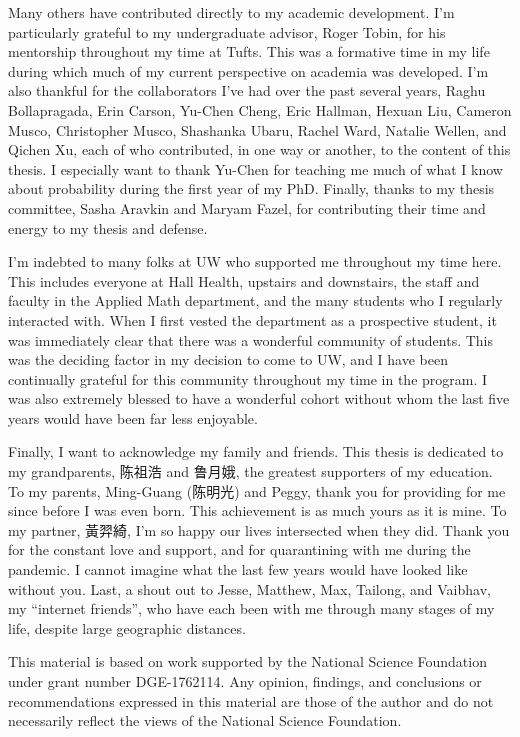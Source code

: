 Many others have contributed directly to my academic development.
I'm particularly grateful to my undergraduate advisor, Roger Tobin, for his mentorship throughout my time at Tufts.
This was a formative time in my life during which much of my current perspective on academia was developed.
I'm also thankful for the collaborators I've had over the past several years, Raghu Bollapragada, Erin Carson, Yu-Chen Cheng, Eric Hallman, Hexuan Liu, Cameron Musco, Christopher Musco, Shashanka Ubaru, Rachel Ward, Natalie Wellen, and Qichen Xu, each of who contributed, in one way or another, to the content of this thesis.
I especially want to thank Yu-Chen for teaching me much of what I know about probability during the first year of my PhD.
Finally, thanks to my thesis committee, Sasha Aravkin and Maryam Fazel, for contributing their time and energy to my thesis and defense.

I'm indebted to many folks at UW who supported me throughout my time here.
This includes everyone at Hall Health, upstairs and downstairs, the staff and faculty in the Applied Math department, and the many students who I regularly interacted with.
When I first vested the department as a prospective student, it was immediately clear that there was a wonderful community of students. 
This was the deciding factor in my decision to come to UW, and I have been continually grateful for this community throughout my time in the program. 
I was also extremely blessed to have a wonderful cohort without whom the last five years would have been far less enjoyable.


Finally, I want to acknowledge my family and friends.
This thesis is dedicated to my grandparents, 陈祖浩 and 鲁月娥, the greatest supporters of my education.
To my parents, Ming-Guang (陈明光) and Peggy, thank you for providing for me since before I was even born.
This achievement is as much yours as it is mine.
To my partner, 黃羿綺, I'm so happy our lives intersected when they did.
Thank you for the constant love and support, and for quarantining with me during the pandemic. 
I cannot imagine what the last few years would have looked like without you.
Last, a shout out to  Jesse, Matthew, Max, Tailong, and Vaibhav, my ``internet friends'', who have each been with me through many stages of my life, despite large geographic distances.

\vfill

This material is based on work supported by the National Science Foundation under grant number DGE-1762114.
Any opinion, findings, and conclusions or recommendations expressed in this material are those of the author and do not necessarily reflect the views of the National Science Foundation.

